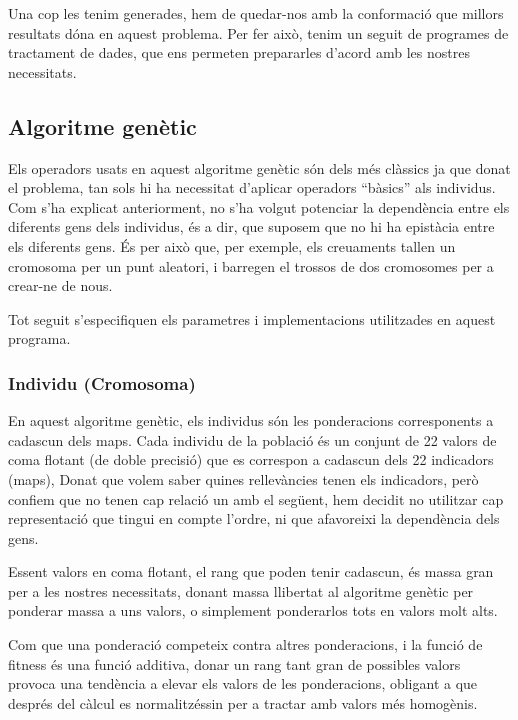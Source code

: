\documentclass[titlepage,a4paper,12pt]{book}
\begin{document}


Una cop les tenim generades, hem de quedar-nos amb la conformació que millors
resultats dóna en aquest problema.  Per fer això, tenim un seguit de programes
de tractament de dades, que ens permeten prepararles d'acord amb les nostres
necessitats.


\subsection{Algoritme genètic} %
\label{sub:genetic}

Els operadors usats en aquest algoritme genètic són dels més clàssics ja que
donat el problema, tan sols hi ha necessitat d'aplicar operadors ``bàsics'' als
individus.  Com s'ha explicat anteriorment, no s'ha volgut potenciar la
dependència entre els diferents gens dels individus, és a dir, que suposem que
no hi ha epistàcia entre els diferents gens.  És per això que, per exemple, els
creuaments tallen un cromosoma per un punt aleatori, i barregen el trossos de
dos cromosomes per a crear-ne de nous.

Tot seguit s'especifiquen els parametres i implementacions utilitzades en aquest
programa.

\subsubsection{Individu (Cromosoma)}
\label{ssub:individu (cromosoma)}

En aquest algoritme genètic, els individus són les ponderacions corresponents a
cadascun dels maps.  Cada individu de la població és un conjunt de 22 valors de
coma flotant (de doble precisió) que es correspon a cadascun dels 22 indicadors
(maps),  Donat que volem saber quines rellevàncies tenen els indicadors, però
confiem que no tenen cap relació un amb el següent, hem decidit no utilitzar cap
representació que tingui en compte l'ordre, ni que afavoreixi la dependència
dels gens. %

Essent valors en coma flotant, el rang que poden tenir cadascun, és massa gran
per a les nostres necessitats, donant massa llibertat al algoritme genètic per
ponderar massa a uns valors, o simplement ponderarlos tots en valors molt alts.

Com que una ponderació competeix contra altres ponderacions, i la funció de
fitness és una funció additiva, donar un rang tant gran de possibles valors
provoca una tendència a elevar els valors de les ponderacions, obligant a que
després del càlcul es normalitzéssin per a tractar amb valors més homogènis.
\end{document}
